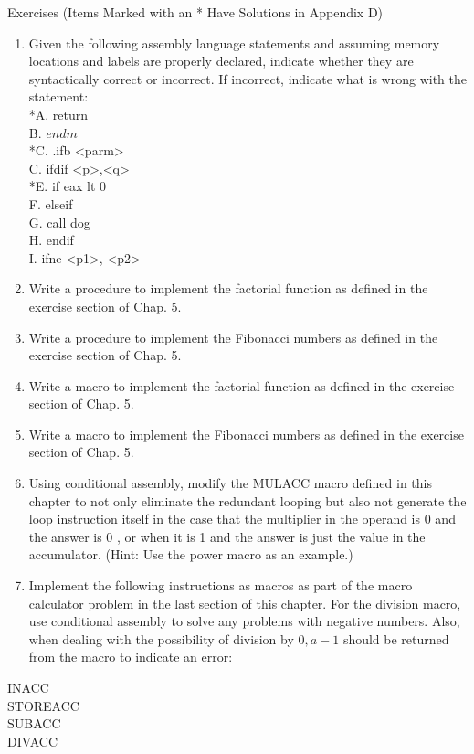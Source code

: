 \documentclass[10pt]{book}
\begin{document}
Exercises (Items Marked with an * Have Solutions in Appendix D)
\begin{enumerate}
  \item Given the following assembly language statements and assuming memory locations and labels are properly declared, indicate whether they are syntactically correct or incorrect. If incorrect, indicate what is wrong with the statement:\\
*A. return\\
B. $e n d m$\\
*C. .ifb <parm>\\
C. ifdif <p>,<q>\\
*E. if eax lt 0\\
F. elseif\\
G. call dog\\
H. endif\\
I. ifne <p1>, <p2>
  \item Write a procedure to implement the factorial function as defined in the exercise section of Chap. 5.
  \item Write a procedure to implement the Fibonacci numbers as defined in the exercise section of Chap. 5.
  \item Write a macro to implement the factorial function as defined in the exercise section of Chap. 5.
  \item Write a macro to implement the Fibonacci numbers as defined in the exercise section of Chap. 5.
  \item Using conditional assembly, modify the MULACC macro defined in this chapter to not only eliminate the redundant looping but also not generate the loop instruction itself in the case that the multiplier in the operand is 0 and the answer is 0 , or when it is 1 and the answer is just the value in the accumulator. (Hint: Use the power macro as an example.)
  \item Implement the following instructions as macros as part of the macro calculator problem in the last section of this chapter. For the division macro, use conditional assembly to solve any problems with negative numbers. Also, when dealing with the possibility of division by $0, a-1$ should be returned from the macro to indicate an error:
\end{enumerate}


INACC\\
STOREACC\\
SUBACC\\
DIVACC
\end{document}

